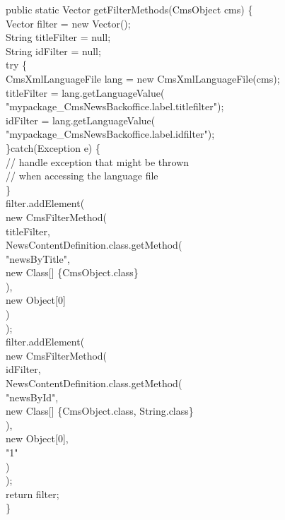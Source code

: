 \begin{java}
\jtaba public static Vector getFilterMethods(CmsObject cms) \{\\
\jtabb   Vector filter = new Vector();\\
\jtabb   String titleFilter = null;\\
\jtabb   String idFilter = null;\\
\jtabb   try \{\\
\jtabc     CmsXmlLanguageFile lang = new CmsXmlLanguageFile(cms);\\
\jtabd     titleFilter = lang.getLanguageValue(\\
\jtabe       "mypackage\_CmsNewsBackoffice.label.titlefilter");\\
\jtabd     idFilter = lang.getLanguageValue(\\
\jtabe       "mypackage\_CmsNewsBackoffice.label.idfilter");\\
\jtabb   \}catch(Exception e) \{\\
\jtabc    // handle exception that might be thrown \\
\jtabc    // when accessing the language file \\
\jtabb   \}\\
\jtabb   filter.addElement(\\
\jtabc     new CmsFilterMethod(\\
\jtabd      titleFilter,\\
\jtabd       NewsContentDefinition.class.getMethod(\\
\jtabe         "newsByTitle",\\
\jtabe         new Class[] \{CmsObject.class\}\\
\jtabd       ),\\
\jtabd       new Object[0]\\
\jtabc     )\\
\jtabb   );\\
\jtabb   filter.addElement(\\
\jtabc     new CmsFilterMethod(\\
\jtabd       idFilter,\\
\jtabd       NewsContentDefinition.class.getMethod(\\
\jtabe         "newsById",\\
\jtabe         new Class[] \{CmsObject.class, String.class\}\\
\jtabd       ),\\
\jtabd       new Object[0],\\
\jtabd       "1"\\
\jtabc     )\\
\jtabb   );\\
\jtabb   return filter;\\
\jtaba \}
\end{java}

